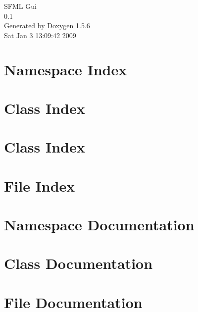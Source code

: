 \documentclass[a4paper]{book}
\begin{document}
\begin{titlepage}
\vspace*{7cm}
\begin{center}
{\Large SFML Gui \\[1ex]\large 0.1 }\\
\vspace*{1cm}
{\large Generated by Doxygen 1.5.6}\\
\vspace*{0.5cm}
{\small Sat Jan 3 13:09:42 2009}\\
\end{center}
\end{titlepage}
\clearemptydoublepage
{}
\tableofcontents
\clearemptydoublepage
{}
\chapter{Namespace Index}

\chapter{Class Index}

\chapter{Class Index}

\chapter{File Index}

\chapter{Namespace Documentation}

\chapter{Class Documentation}





\chapter{File Documentation}











\printindex
\end{document}
